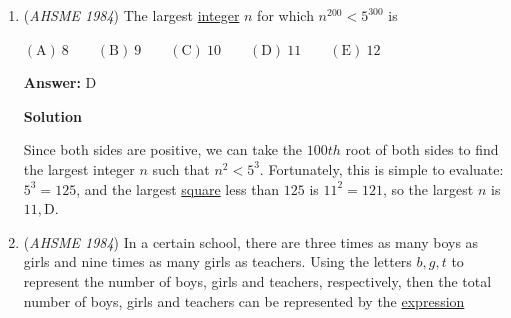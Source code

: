 \begin{enumerate}
 Draw $BE$ and $CF$, forming a \href{https://artofproblemsolving.com/wiki/index.php?title=Trapezoid}{trapezoid}. Since it's cyclic, this trapezoid must be \href{https://artofproblemsolving.com/wiki/index.php?title=Isosceles\_trapezoid}{isosceles}. Also, drop \href{https://artofproblemsolving.com/wiki/index.php?title=Altitude}{altitudes} from $E$ to $AC$, $B$ to $DF$, and $C$ to $DF$, and let the feet of these altitudes be $G$, $H$, and $I$ respectively. $AGED$ is a \href{https://artofproblemsolving.com/wiki/index.php?title=Rectangle}{rectangle} since it has $4$ \href{https://artofproblemsolving.com/wiki/index.php?title=Right\_angle}{right angles}. Therefore, $AG=DE=3$, and $GB=4-3=1$. By the same logic, $GBHE$ is also a rectangle, and $EH=GB=1$. $BH=CI$ since they're both altitudes to a trapezoid, and $BE=CF$ since the trapezoid is isosceles. Therefore, $\triangle BHE \cong \triangle CIF$ by HL \href{https://artofproblemsolving.com/wiki/index.php?title=Congruence}{congruence}, so $IF=EH=1$. Also, $BCIH$ is a rectangle from $4$ right angles, and $HI=BC=5$. Therefore, $EF=EH+HI+IF=1+5+1=\boxed{7}$.

 


	\item (\textit{AHSME 1984}) The largest \href{https://artofproblemsolving.com/wiki/index.php?title=Integer}{integer} $n$ for which $n^{200}<5^{300}$ is


 $\mathrm{(A) \ }8 \qquad \mathrm{(B) \ }9 \qquad \mathrm{(C) \ } 10 \qquad \mathrm{(D) \ }11 \qquad \mathrm{(E) \ } 12$

 \textbf{Answer: }D



\textbf{Solution}

Since both sides are positive, we can take the $100th$ root of both sides to find the largest integer $n$ such that $n^2<5^3$. Fortunately, this is simple to evaluate: $5^3=125$, and the largest \href{https://artofproblemsolving.com/wiki/index.php?title=Perfect\_square}{square} less than $125$ is $11^2=121$, so the largest $n$ is $11, \boxed{\text{D}}$.

 


	\item (\textit{AHSME 1984}) In a certain school, there are three times as many boys as girls and nine times as many girls as teachers. Using the letters $b, g, t$ to represent the number of boys, girls and teachers, respectively, then the total number of boys, girls and teachers can be represented by the \href{https://artofproblemsolving.com/wiki/index.php?title=Expression}{expression}



\end{enumerate}

